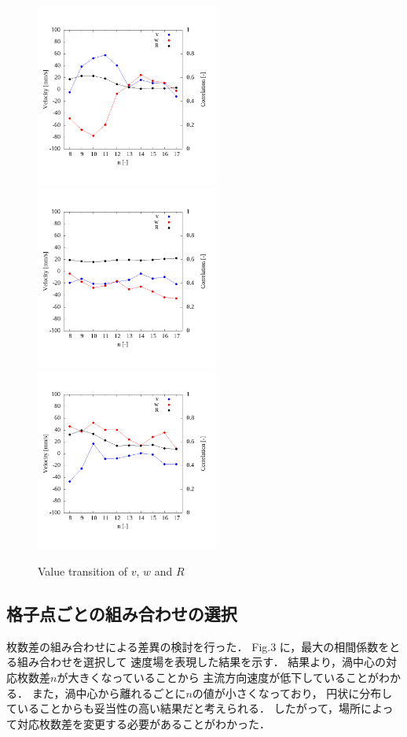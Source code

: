 \documentclass[twocolumn,a4j]{jsarticle}
\begin{document}
\begin{figure}[htbp]
  \begin{center}
    \includegraphics[width=60mm]{../images/x=40,y=10.png}
    \includegraphics[width=60mm]{../images/x=50,y=20.png}
    \includegraphics[width=60mm]{../images/x=90,y=20.png}
  \end{center}
  \caption{Value transition of $v$, $w$ and $R$}
\end{figure}

\subsection{格子点ごとの組み合わせの選択}
枚数差の組み合わせによる差異の検討を行った．
Fig.3 に，最大の相間係数をとる組み合わせを選択して
速度場を表現した結果を示す．
結果より，渦中心の対応枚数差$n$が大きくなっていることから
主流方向速度が低下していることがわかる．
また，渦中心から離れるごとに$n$の値が小さくなっており，
円状に分布していることからも妥当性の高い結果だと考えられる．
したがって，場所によって対応枚数差を変更する必要があることがわかった．
\end{document}
